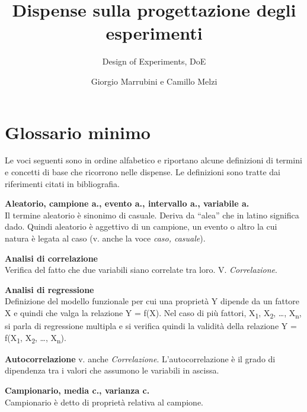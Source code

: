 \documentclass[
  11pt,
]{book}
\title{Dispense sulla progettazione degli esperimenti}
\subtitle{Design of Experiments, DoE}
\author{Giorgio Marrubini e Camillo Melzi}
\date{}
\begin{document}
\maketitle

{
\hypersetup{linkcolor=}
\setcounter{tocdepth}{1}
\tableofcontents
}
\hypertarget{section}{%
\chapter*{}\label{section}}

\hypertarget{glossario}{%
\chapter*{Glossario minimo}\label{glossario}}

Le voci seguenti sono in ordine alfabetico e riportano alcune definizioni di termini e concetti di base che ricorrono nelle dispense.
Le definizioni sono tratte dai riferimenti citati in bibliografia.
\citep{legarzantine2014, everittb.s.skrondala.2010, wonnacottt.h.wonnacottr.j.2002}

\textbf{Aleatorio, campione a., evento a., intervallo a., variabile a.}\\
Il termine aleatorio è sinonimo di casuale.
Deriva da ``alea'' che in latino significa dado.
Quindi aleatorio è aggettivo di un campione, un evento o altro la cui natura è legata al caso (v. anche la voce \emph{caso, casuale}).

\textbf{Analisi di correlazione}\\
Verifica del fatto che due variabili siano correlate tra loro.
V. \emph{Correlazione}.

\textbf{Analisi di regressione}\\
Definizione del modello funzionale per cui una proprietà Y dipende da un fattore X e quindi che valga la relazione Y = f(X).
Nel caso di più fattori, X\textsubscript{1}, X\textsubscript{2}, \ldots, X\textsubscript{n}, si parla di regressione multipla e si verifica quindi la validità della relazione Y = f(X\textsubscript{1}, X\textsubscript{2}, \ldots, X\textsubscript{n}).

\textbf{Autocorrelazione} v. anche \emph{Correlazione}.
L'autocorrelazione è il grado di dipendenza tra i valori che assumono le variabili in ascissa.

\textbf{Campionario, media c., varianza c.}\\
Campionario è detto di proprietà relativa al campione.
\end{document}

